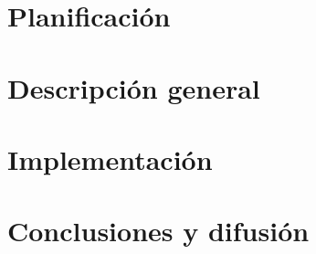 \documentclass[a4paper,11pt]{article}
\begin{document}
\section{Planificación}

\section{Descripción general}

\section{Implementación}

\section{Conclusiones y difusión}
\end{document}
